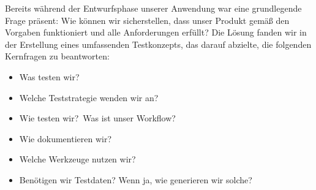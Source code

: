 Bereits während der Entwurfsphase unserer Anwendung war eine grundlegende Frage präsent: Wie können wir sicherstellen, dass unser Produkt gemäß den Vorgaben funktioniert und alle Anforderungen erfüllt?
Die Lösung fanden wir in der Erstellung eines umfassenden Testkonzepts, das darauf abzielte, die folgenden Kernfragen zu beantworten:

\begin{itemize}
    \item Was testen wir?
    \item Welche Teststrategie wenden wir an?
    \item Wie testen wir?\ Was ist unser Workflow?
    \item Wie dokumentieren wir?
    \item Welche Werkzeuge nutzen wir?
    \item Benötigen wir Testdaten? Wenn ja, wie generieren wir solche?
\end{itemize}